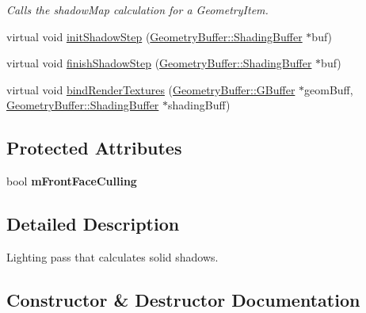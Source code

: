 \begin{DoxyCompactItemize}
\begin{DoxyCompactList}\small\item\em Calls the shadow\+Map calculation for a Geometry\+Item. \end{DoxyCompactList}\item 
virtual void \mbox{\hyperlink{class_geometry_engine_1_1_geometry_render_step_1_1_shadowed_lighting_pass_aa3e4ac77bbac23eedb2ae88d8ba1604f}{init\+Shadow\+Step}} (\mbox{\hyperlink{class_geometry_engine_1_1_geometry_buffer_1_1_shading_buffer}{Geometry\+Buffer\+::\+Shading\+Buffer}} $\ast$buf)
\item 
virtual void \mbox{\hyperlink{class_geometry_engine_1_1_geometry_render_step_1_1_shadowed_lighting_pass_aeedeb98164bebcb7c1cef69e529835e4}{finish\+Shadow\+Step}} (\mbox{\hyperlink{class_geometry_engine_1_1_geometry_buffer_1_1_shading_buffer}{Geometry\+Buffer\+::\+Shading\+Buffer}} $\ast$buf)
\item 
virtual void \mbox{\hyperlink{class_geometry_engine_1_1_geometry_render_step_1_1_shadowed_lighting_pass_a27c247de79b9f159eed0545f81d9434e}{bind\+Render\+Textures}} (\mbox{\hyperlink{class_geometry_engine_1_1_geometry_buffer_1_1_g_buffer}{Geometry\+Buffer\+::\+G\+Buffer}} $\ast$geom\+Buff, \mbox{\hyperlink{class_geometry_engine_1_1_geometry_buffer_1_1_shading_buffer}{Geometry\+Buffer\+::\+Shading\+Buffer}} $\ast$shading\+Buff)
\end{DoxyCompactItemize}
\subsection*{Protected Attributes}
\begin{DoxyCompactItemize}
\item 
\mbox{\label{class_geometry_engine_1_1_geometry_render_step_1_1_shadowed_lighting_pass_aae3f3534c07598d23a6e397dfde2acb9}} 
bool {\bfseries m\+Front\+Face\+Culling}
\end{DoxyCompactItemize}


\subsection{Detailed Description}
Lighting pass that calculates solid shadows. 

\subsection{Constructor \& Destructor Documentation}
\mbox{\label{class_geometry_engine_1_1_geometry_render_step_1_1_shadowed_lighting_pass_a16b97807a606bb5ac276e6c9c6e5f745}} 

